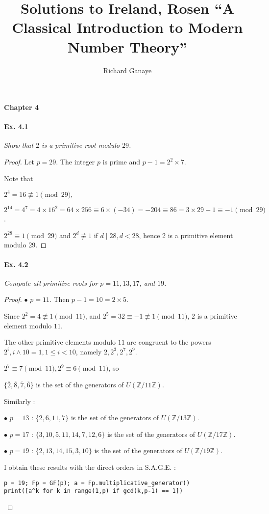 \documentclass[11pt,a4paper]{article}
\title{Solutions to Ireland, Rosen ``A Classical Introduction to Modern Number Theory''}
\author{Richard Ganaye}
\newcommand{\Z}{\mathbb{Z}}
\begin{document}
\maketitle

{\large \bf Chapter 4}

\paragraph{Ex. 4.1}

{\it Show that $2$ is a primitive root modulo $29$.
}

\begin{proof}
Let $p=29$. The integer $p$ is prime and $p-1 = 2^2\times 7$.

Note that

$2^4 = 16 \not \equiv1\pmod {29},$

$2^{14} =  4 ^7 =4 \times 16^2 = 64\times 256 \equiv 6 \times (-34)=-204\equiv 86=3\times 29 -1 \equiv -1\pmod{29}$.

$2^{28} \equiv 1\pmod {29}$ and $2^d \not \equiv 1$ if $d \mid 28, d < 28$, hence 2 is a primitive element modulo 29.
\end{proof}

\paragraph{Ex. 4.2}

{\it Compute all primitive roots for $p = 11, 13, 17$, and $19$.
}

\begin{proof}
$\bullet$ $p=11$. Then $p-1 = 10 = 2\times 5$.

Since $2^2 = 4 \not \equiv 1 \pmod {11}$, and $2^5 = 32 \equiv -1 \not \equiv 1 \pmod{11}$, $2$ is a primitive element modulo $11$.

The other primitive elements modulo $11$ are congruent to the powers $2^i, i\wedge 10 = 1, 1\leq i <10$, namely $2,2^3,2^7,2^9$.

$2^7 \equiv 7 \pmod {11},2^9 \equiv 6 \pmod {11}$, so

$ \{\overline{2}, \overline{8}, \overline{7}, \overline{6}\}$ is the set of the generators of $U(\Z/11\Z)$.

Similarly :

$\bullet$ $p=13$ : $\{2,6,11,7\}$ is the set of the generators of $U(\Z/13\Z)$.

$\bullet$ $p=17$ : $\{3, 10, 5, 11, 14, 7, 12, 6\}$ is the set of the generators of $U(\Z/17\Z)$.

$\bullet$ $p=19$ : $\{2, 13, 14, 15, 3, 10\}$ is the set of the generators of $U(\Z/19\Z)$.

I obtain these results with the direct orders in S.A.G.E. :
\begin{verbatim}
p = 19; Fp = GF(p); a = Fp.multiplicative_generator()
print([a^k for k in range(1,p) if gcd(k,p-1) == 1])
\end{verbatim}
\end{proof}
\end{document}
